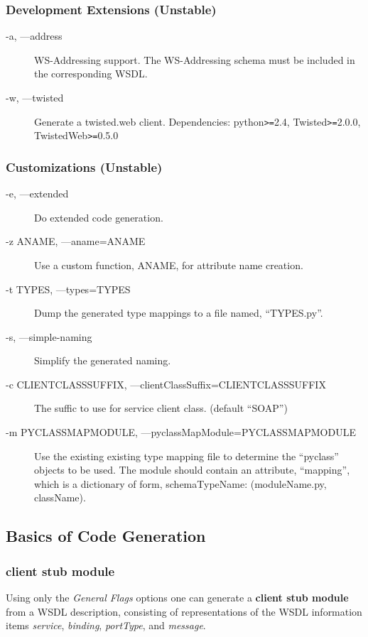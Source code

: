 \subsubsection{Development Extensions (Unstable) }
\begin{description}
\item[-a, ---address] WS-Addressing support.  The WS-Addressing schema must be
included in the corresponding WSDL.
\item[-w, ---twisted] Generate a twisted.web client.  Dependencies: 
python\verb!>=!2.4, Twisted\verb!>=!2.0.0, TwistedWeb\verb!>=!0.5.0
\end{description}

\subsubsection{Customizations (Unstable) }
\begin{description}
\item[-e, ---extended] Do extended code generation.
\item[-z ANAME, ---aname=ANAME] Use a custom function, ANAME, for attribute name
creation.
\item[-t TYPES, ---types=TYPES] Dump the generated type mappings to a file
named, ``TYPES.py''.
\item[-s, ---simple-naming] Simplify the generated naming.
\item[-c CLIENTCLASSSUFFIX, ---clientClassSuffix=CLIENTCLASSSUFFIX] The suffic
to use for service client class. (default ``SOAP'')
\item[-m PYCLASSMAPMODULE, ---pyclassMapModule=PYCLASSMAPMODULE] Use the
existing existing type mapping file to determine the ``pyclass'' objects to be
used.  The module should contain an attribute, ``mapping'', which is a
dictionary of form, {schemaTypeName: (moduleName.py, className)}.
\end{description}

\subsection{Basics of Code Generation}
\label{subsection:Basics of Code Generation}

\subsubsection{client stub module}
Using only the {\it General Flags} options one can generate a 
{\bfseries client stub module} from a WSDL description, consisting of
representations of the WSDL information items {\it service}, {\it binding}, 
{\it portType}, and {\it message}.



